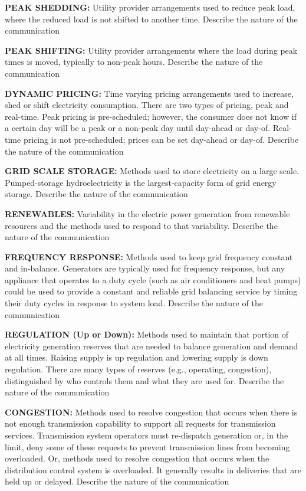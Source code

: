 \wl
\noindent
\textbf{PEAK SHEDDING:}  Utility provider arrangements used to reduce peak load, where the 
reduced load is not shifted to another time. 
Describe the nature of the communication	

\wl
\noindent
\textbf{PEAK SHIFTING:}  Utility provider arrangements where the load during peak times is moved, typically 
to non-peak hours. 
Describe the nature of the communication	

\wl
\noindent
\textbf{DYNAMIC PRICING:}  Time varying pricing arrangements used to increase, shed or shift electricity 
consumption. There are two types of pricing, peak and real-time.  Peak pricing is pre-scheduled; 
however, the consumer does not know if a certain day will be a peak or a non-peak day until day-ahead 
or day-of.  Real-time pricing is not pre-scheduled; prices can be set day-ahead or day-of.	
Describe the nature of the communication	

\wl
\noindent
\textbf{GRID SCALE STORAGE:}  Methods used to store electricity on a large scale. Pumped-storage 
hydroelectricity is the largest-capacity form of grid energy storage. 
Describe the nature of the communication	

\wl
\noindent
\textbf{RENEWABLES:}  Variability in the electric power generation from renewable resources 
and the methods used to respond to that variability. 
Describe the nature of the communication	

\wl
\noindent
\textbf{FREQUENCY RESPONSE:}  Methods used to keep grid frequency constant and in-balance. 
Generators are typically used for frequency response, but any appliance that operates 
to a duty cycle (such as air conditioners and heat pumps) could be used to provide 
a constant and reliable grid balancing service by timing their duty cycles in response 
to system load.   	
Describe the nature of the communication	

\wl
\noindent
\textbf{REGULATION (Up or Down):} Methods used to maintain that portion of electricity generation 
reserves that are needed to balance generation and demand at all times.  Raising supply 
is up regulation and lowering supply is down regulation. There are many types of reserves 
(e.g., operating, congestion), distinguished by who controls them and what they are used for. 
Describe the nature of the communication	

\wl
\noindent
\textbf{CONGESTION:} Methods used to resolve congestion that occurs when there is not enough 
transmission capability to support all requests for transmission services. Transmission 
system operators must re-dispatch generation or, in the limit, deny some of these 
requests to prevent transmission lines from becoming overloaded.  Or, methods used to 
resolve congestion that occurs when the distribution control system is overloaded.  It 
generally results in deliveries that are held up or delayed.     
Describe the nature of the communication

